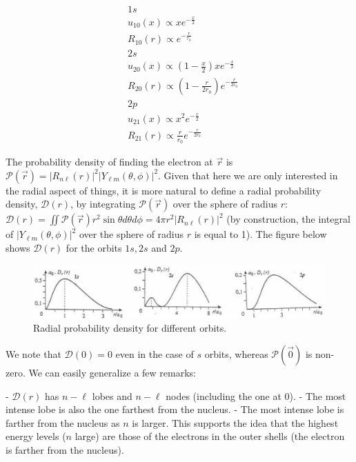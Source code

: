 \documentclass{article}
\begin{document}
\begin{enumerate}
{    $$
    \begin{aligned}
    & 1 s \\
    & u_{10}(x) \propto x e^{-\frac{x}{2}} \\
    & R_{10}(r) \propto e^{-\frac{r}{r_{0}}} \\
    & 2 s \\
    & u_{20}(x) \propto \left(1 - \frac{x}{2}\right) x e^{-\frac{x}{2}} \\
    & R_{20}(r) \propto \left(1 - \frac{r}{2 r_{0}}\right) e^{-\frac{r}{2 r_{0}}} \\
    & 2 p \\
    & u_{21}(x) \propto x^{2} e^{-\frac{x}{2}} \\
    & R_{21}(r) \propto \frac{r}{r_{0}} e^{-\frac{r}{2 r_{0}}}
    \end{aligned}
    $$

    The probability density of finding the electron at $\vec{r}$ is $\mathcal{P}(\vec{r}) = \left|R_{n \ell}(r)\right|^{2} \left|Y_{\ell m}(\theta, \phi)\right|^{2}$. Given that here we are only interested in the radial aspect of things, it is more natural to define a radial probability density, $\mathcal{D}(r)$, by integrating $\mathcal{P}(\vec{r})$ over the sphere of radius $r$: $\mathcal{D}(r) = \iint \mathcal{P}(\vec{r}) r^{2} \sin \theta d \theta d \phi = 4 \pi r^{2} \left|R_{n \ell}(r)\right|^{2}$ (by construction, the integral of $\left|Y_{\ell m}(\theta, \phi)\right|^{2}$ over the sphere of radius $r$ is equal to 1). The figure below shows $\mathcal{D}(r)$ for the orbits $1s, 2s$ and $2p$.

    \begin{figure}[h]
        \centering
        \includegraphics[width=\textwidth]{fig2.png}
        \caption{Radial probability density for different orbits.}
    \end{figure}

    We note that $\mathcal{D}(0) = 0$ even in the case of $s$ orbits, whereas $\mathcal{P}(\overrightarrow{0})$ is non-zero. We can easily generalize a few remarks:

    - $\mathcal{D}(r)$ has $n - \ell$ lobes and $n - \ell$ nodes (including the one at 0).
    - The most intense lobe is also the one farthest from the nucleus.
    - The most intense lobe is farther from the nucleus as $n$ is larger. This supports the idea that the highest energy levels ($n$ large) are those of the electrons in the outer shells (the electron is farther from the nucleus).}


\end{enumerate}
\end{document}
